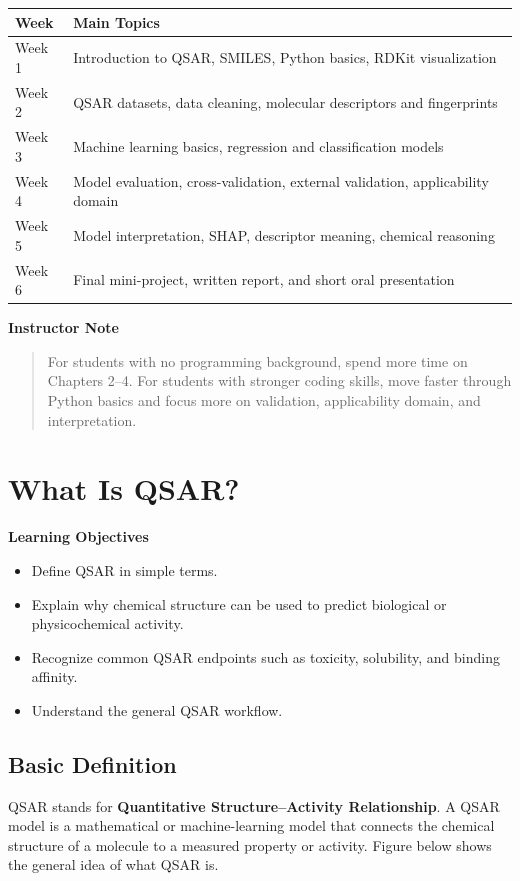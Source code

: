 \documentclass[11pt]{report}
\newenvironment{Important note}{\begin{quote}\color{red}\textbf{Important note:} }{\end{quote}}
\newenvironment{learningobjectives}
{\vspace{0.5em}\noindent\textbf{Learning Objectives}\begin{itemize}[leftmargin=*]}
{\end{itemize}\vspace{0.5em}}
\newenvironment{instructornote}
{\vspace{0.5em}\noindent\textbf{Instructor Note}\begin{quote}}
{\end{quote}\vspace{0.5em}}
\begin{document}
\begin{longtable}{p{}p{}}
\toprule
\textbf{Week} & \textbf{Main Topics} \\
\midrule
Week 1 & Introduction to QSAR, SMILES, Python basics, RDKit visualization \\
Week 2 & QSAR datasets, data cleaning, molecular descriptors and fingerprints \\
Week 3 & Machine learning basics, regression and classification models \\
Week 4 & Model evaluation, cross-validation, external validation, applicability domain \\
Week 5 & Model interpretation, SHAP, descriptor meaning, chemical reasoning \\
Week 6 & Final mini-project, written report, and short oral presentation \\
\bottomrule
\end{longtable}

\begin{instructornote}
For students with no programming background, spend more time on Chapters 2--4. For students with stronger coding skills, move faster through Python basics and focus more on validation, applicability domain, and interpretation.
\end{instructornote}

\chapter{What Is QSAR?}

\begin{learningobjectives}
    \item Define QSAR in simple terms.
    \item Explain why chemical structure can be used to predict biological or physicochemical activity.
    \item Recognize common QSAR endpoints such as toxicity, solubility, and binding affinity.
    \item Understand the general QSAR workflow.
\end{learningobjectives}

\section{Basic Definition}

QSAR stands for \textbf{Quantitative Structure--Activity Relationship}. A QSAR model is a mathematical or machine-learning model that connects the chemical structure of a molecule to a measured property or activity. Figure below shows the general idea of what QSAR is.
\end{document}
